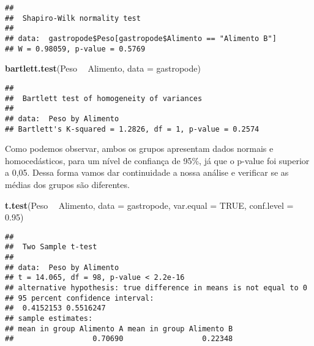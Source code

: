 \documentclass[]{book}
\newenvironment{Shaded}{\begin{snugshade}}{\end{snugshade}}
\newcommand{\DataTypeTok}[1]{\textcolor[rgb]{0.13,0.29,0.53}{#1}}
\newcommand{\FloatTok}[1]{\textcolor[rgb]{0.00,0.00,0.81}{#1}}
\newcommand{\KeywordTok}[1]{\textcolor[rgb]{0.13,0.29,0.53}{\textbf{#1}}}
\newcommand{\NormalTok}[1]{#1}
\newcommand{\OperatorTok}[1]{\textcolor[rgb]{0.81,0.36,0.00}{\textbf{#1}}}
\newcommand{\OtherTok}[1]{\textcolor[rgb]{0.56,0.35,0.01}{#1}}
\newcommand{\StringTok}[1]{\textcolor[rgb]{0.31,0.60,0.02}{#1}}
\begin{document}
\begin{Shaded}
\end{Shaded}

\begin{verbatim}
## 
##  Shapiro-Wilk normality test
## 
## data:  gastropode$Peso[gastropode$Alimento == "Alimento B"]
## W = 0.98059, p-value = 0.5769
\end{verbatim}

\begin{Shaded}
\begin{Highlighting}[]
\KeywordTok{bartlett.test}\NormalTok{(Peso }\OperatorTok{~}\StringTok{ }\NormalTok{Alimento, }\DataTypeTok{data =}\NormalTok{ gastropode)}
\end{Highlighting}
\end{Shaded}

\begin{verbatim}
## 
##  Bartlett test of homogeneity of variances
## 
## data:  Peso by Alimento
## Bartlett's K-squared = 1.2826, df = 1, p-value = 0.2574
\end{verbatim}

Como podemos observar, ambos os grupos apresentam dados normais e homocedásticos, para um nível de confiança de 95\%, já que o p-value foi superior a 0,05. Dessa forma vamos dar continuidade a nossa análise e verificar se as médias dos grupos são diferentes.

\begin{Shaded}
\begin{Highlighting}[]
\KeywordTok{t.test}\NormalTok{(Peso }\OperatorTok{~}\StringTok{ }\NormalTok{Alimento, }
       \DataTypeTok{data =}\NormalTok{ gastropode,}
       \DataTypeTok{var.equal =} \OtherTok{TRUE}\NormalTok{,}
       \DataTypeTok{conf.level =} \FloatTok{0.95}\NormalTok{)}
\end{Highlighting}
\end{Shaded}

\begin{verbatim}
## 
##  Two Sample t-test
## 
## data:  Peso by Alimento
## t = 14.065, df = 98, p-value < 2.2e-16
## alternative hypothesis: true difference in means is not equal to 0
## 95 percent confidence interval:
##  0.4152153 0.5516247
## sample estimates:
## mean in group Alimento A mean in group Alimento B 
##                  0.70690                  0.22348
\end{verbatim}
\end{document}
